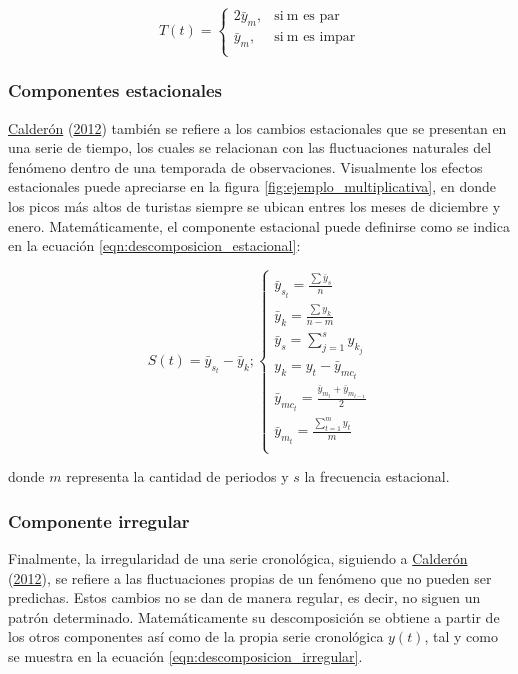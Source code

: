 \documentclass[
]{article}
\begin{document}
\begin{equation}
\label{eqn:descomposicion_tendencia}
T(t)=
\begin{cases}
2\bar y_{m}, & \text{si}\ \text{m es par} \\
\bar y_{m}, & \text{si}\ \text{m es impar} \\
\end{cases}
\end{equation}

\subsubsection{Componentes estacionales}

\protect\hyperlink{ref-calderon2012estadistica}{Calderón}
(\protect\hyperlink{ref-calderon2012estadistica}{2012}) también se
refiere a los cambios estacionales que se presentan en una serie de
tiempo, los cuales se relacionan con las fluctuaciones naturales del
fenómeno dentro de una temporada de observaciones. Visualmente los
efectos estacionales puede apreciarse en la figura
\ref{fig:ejemplo_multiplicativa}, en donde los picos más altos de
turistas siempre se ubican entres los meses de diciembre y enero.
Matemáticamente, el componente estacional puede definirse como se indica
en la ecuación \ref{eqn:descomposicion_estacional}:

\begin{equation}
\label{eqn:descomposicion_estacional}
S(t)=\bar{y}_{s_t}-\bar{y}_{k};
\begin{cases}
\bar{y}_{s_t} = \frac{\sum \bar{y}_s}{n} \\
\bar{y}_k = \frac{\sum y_k}{n-m} \\
\bar{y}_s = \sum_{j=1}^s y_{k_j} \\
y_k = y_t - \bar{y}_{mc_t} \\
\bar{y}_{mc_t} = \frac{\bar{y}_{m_t} + \bar{y}_{m_{t-1}}}{2} \\
\bar{y}_{m_t} = \frac{\sum_{t=1}^m y_t}{m} \\
\end{cases}
\end{equation}

donde \(m\) representa la cantidad de periodos y \(s\) la frecuencia
estacional.

\subsubsection{Componente irregular}

Finalmente, la irregularidad de una serie cronológica, siguiendo a
\protect\hyperlink{ref-calderon2012estadistica}{Calderón}
(\protect\hyperlink{ref-calderon2012estadistica}{2012}), se refiere a
las fluctuaciones propias de un fenómeno que no pueden ser predichas.
Estos cambios no se dan de manera regular, es decir, no siguen un patrón
determinado. Matemáticamente su descomposición se obtiene a partir de
los otros componentes así como de la propia serie cronológica \(y(t)\),
tal y como se muestra en la ecuación \ref{eqn:descomposicion_irregular}.
\end{document}
